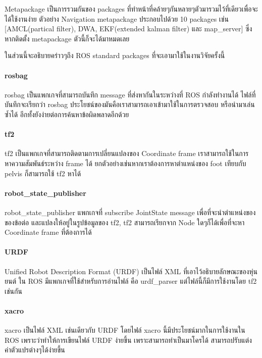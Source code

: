 Metapackage เป็นการรวมกันของ packages ที่ทำหน้าที่คล้ายๆกันหลายๆตัวมารวมไว้ที่เดียวเพื่อจะได้ใช้งานง่าย
ตัวอย่าง Navigation metapackage ประกอบไปด้วย 10 packages เช่น [AMCL(partical filter), DWA, EKF(extended kalman filter) 
และ map\_server] ซึ่งหากติดตั้ง metapackage ตัวนี้ก็จะได้มาหมดเลย

ในส่วนนี้จะอธิบายคร่าวๆถึง ROS standard packages ที่จะเอามาใช้ในงานวิจัยครั้งนี้

\paragraph*{rosbag}
rosbag เป็นแพกเกจที่สามารถบันทึก message ที่ส่งหากันในระหว่างที่ ROS กำลังทำงานได้
ไฟล์ที่บันทึกจะเรียกว่า rosbag ประโยชน์ของมันคือเราสามารถเอาเข้ามาใช้ในการตรวจสอบ
หรือนำมาเล่นซ้ำได้ อีกทั้งยังง่ายต่อการค้นหาข้อผิดพลาดอีกด้วย

\paragraph*{tf2}
tf2 เป็นแพกเกจที่สามารถติดตามการเปลี่ยนแปลงของ Coordinate frame เราสามารถใช้ในการหาความสัมพันธ์ระหว่าง
frame ได้ ยกตัวอย่างเช่นหากเราต้องการหาตำแหน่งของ foot เทียบกับ pelvis ก็สามารถใช้ tf2 หาได้

\paragraph*{robot\_state\_publisher}
robot\_state\_publisher แพกเกจที่ subscribe JointState message เพื่อที่จะนำตำแหน่งของของข้อต่อ
และแปลงให้อยู่ในรูปข้อมูลของ tf2, tf2 สามารถเรียกจาก Node ใดๆก็ได้เพื่อที่จะหา Coordinate frame ที่ต้องการได้

\paragraph*{URDF}
Unified Robot Description Format (URDF) เป็นไฟล์ XML ที่เอาไว้อธิบายลักษณะของหุ่นยนต์
ใน ROS มีแพกเกจที่ใช้สำหรับการอ่านไฟล์ คือ urdf\_parser แต่ไฟล์นี้ก็มีการใช้งานโดย tf2 เช่นกัน

\paragraph*{xacro}
xacro เป็นไฟล์ XML เช่นเดียวกับ URDF โดยไฟล์ xacro นี้มีประโยชน์มากในการใช้งานใน ROS เพราะว่าทำให้การเขียนไฟล์
URDF ง่ายขึ้น เพราะสามารถทำเป็นมาโครได้ สามารถปรับแต่งค่าตัวแปรต่างๆได้ง่ายขึ้น

\clearpage
